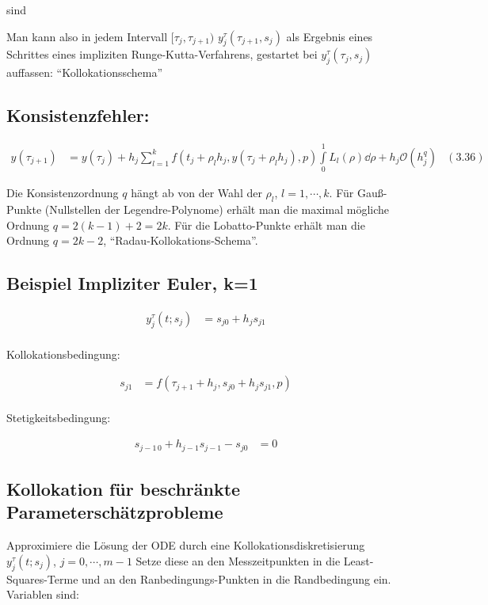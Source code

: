 sind

Man kann also in jedem Intervall $[\tau_j,\tau_{j+1})$ $y_j^\tau(\tau_{j+1}, s_j)$ als Ergebnis eines Schrittes eines impliziten Runge-Kutta-Verfahrens, gestartet bei $y_j^\tau (\tau_j, s_j)$ auffassen: "`Kollokationsschema"'

\subsection*{Konsistenzfehler:}

\begin{align*}
y(\tau_{j+1}) &= y(\tau_j) + h_j \sum\limits_{l=1}^k f(t_j + \rho_l h_j, y(\tau_j + \rho_l h_j), p) \int\limits_0^1 L_l(\rho) \dd \rho + h_j \mathcal O(h_j^q) & (3.36)
\end{align*}

Die Konsistenzordnung $q$ hängt ab von der Wahl der $\rho_l$, $l=1,\cdots,k$. Für Gauß-Punkte (Nullstellen der Legendre-Polynome) erhält man die maximal mögliche Ordnung $q=2(k-1)+2 = 2k$. Für die Lobatto-Punkte erhält man die Ordnung $q=2k-2$, "`Radau-Kollokations-Schema"'.

\subsection*{Beispiel Impliziter Euler, k=1}

\begin{align*}
y_j^\tau (t;s_j) &= s_{j0} + h_j s_{j1} \\
\end{align*}


Kollokationsbedingung:

\begin{align*}
s_{j1} &= f(\tau_{j+1} + h_j, s_{j0} + h_j s_{j1}, p) \\
\end{align*}

Stetigkeitsbedingung:

\begin{align*}
s_{j-1\,0} + h_{j-1}s_{j-1} - s_{j0} &= 0 
\end{align*}

\subsection*{Kollokation für beschränkte Parameterschätzprobleme}

Approximiere die Lösung der ODE durch eine Kollokationsdiskretisierung $y_j^\tau (t; s_j)$, $j=0,\cdots,m-1$ Setze diese an den Messzeitpunkten in die Least-Squares-Terme und an den Ranbedingungs-Punkten in die Randbedingung ein. Variablen sind:

